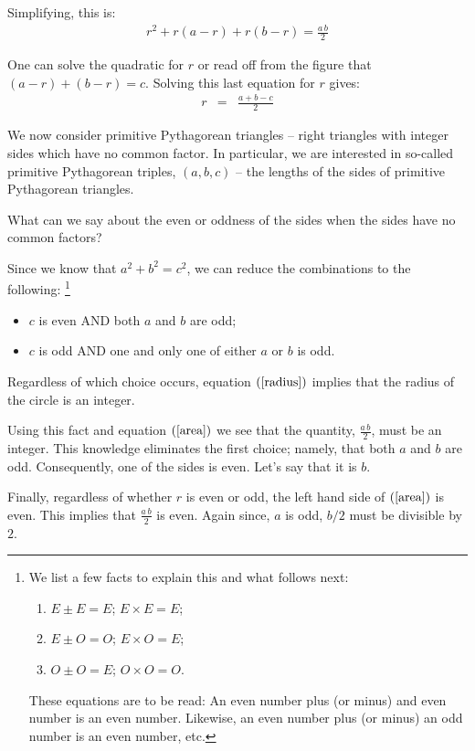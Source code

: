 \documentclass[12pt]{article}
\begin{document}
Simplifying, this is:
\begin{eqnarray}
r^2 + r(a - r) + r(b-r) = \frac{a\, b}{2} \label{area} 
\end{eqnarray}

One can solve the quadratic for $r$ or read off from the figure 
that $(a-r) + (b-r) = c$. Solving this last equation for $r$ gives:
\begin{eqnarray}
  r & = & \frac{a + b - c}{2} \label{radius}
\end{eqnarray}

We now consider primitive Pythagorean triangles -- right 
triangles with integer sides which have no common factor.
In particular, we are interested in so-called primitive Pythagorean triples,
$(a,b,c)$ -- the lengths of the sides of primitive Pythagorean triangles.

What can we say about the even or oddness of the sides when the sides have no 
common factors? 

Since we know that $a^2 + b^2 = c^2$, we can reduce the combinations to 
the following:%
\footnote{We list a few facts to explain this and what follows next:
\begin{enumerate}
    \item{$E \pm E = E$; $ E \times E = E$;}
    \item{$E \pm O = O$; $ E \times O = E$;}
    \item{$O \pm O = E$; $ O \times O = O$.}
\end{enumerate}
These equations are to be read: An even number plus (or minus) and even number 
is an even number.
Likewise, an even number plus (or minus) an odd number is an even number, etc.
}
\begin{itemize}
  \item{$c$ is even AND both $a$ and $b$ are odd;}
  \item{$c$ is odd AND one and only one of either $a$ or $b$ is odd.}
\end{itemize}

Regardless of which choice occurs, equation $(\ref{radius})$ implies that 
the radius of the circle is an integer.%

Using this fact and equation $(\ref{area})$ we see that the quantity, 
$\frac{a \, b}{2}$, must be an integer. 
This knowledge eliminates the first choice; namely, that both $a$ and $b$ 
are odd. Consequently, one of the sides
is even. Let's say that it is $b$.

Finally, regardless of whether $r$ is even or odd, the left hand side of 
$(\ref{area})$ is even. This implies that $\frac{a \, b}{2}$
is even. Again since, $a$ is odd, $b/2$ must be divisible by $2$.
\end{document}
